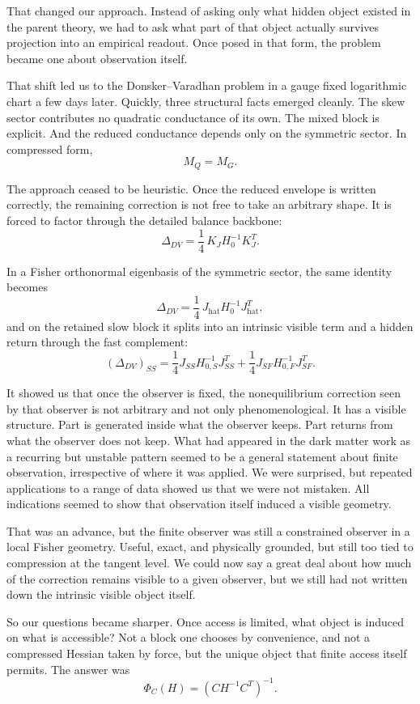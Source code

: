 \documentclass[11pt,a4paper]{article}
\numberwithin{equation}{section}
\theoremstyle{thmcompact}
\theoremstyle{remark}
\begin{document}
That changed our approach. Instead of asking only what hidden object existed in the parent theory, we had to ask what part of that object actually survives projection into an empirical readout. Once posed in that form, the problem became one about observation itself.

That shift led us to the Donsker--Varadhan problem in a gauge fixed logarithmic chart a few days later. Quickly, three structural facts emerged cleanly. The skew sector contributes no quadratic conductance of its own. The mixed block is explicit. And the reduced conductance depends only on the symmetric sector. In compressed form,
\[
M_Q = M_G.
\]

The approach ceased to be heuristic. Once the reduced envelope is written correctly, the remaining correction is not free to take an arbitrary shape. It is forced to factor through the detailed balance backbone:
\[
\Delta_{DV} = \frac14 \, K_J H_0^{-1} K_J^T.
\]

In a Fisher orthonormal eigenbasis of the symmetric sector, the same identity becomes
\[
\Delta_{DV} = \frac14 \, J_{\mathrm{hat}} H_0^{-1} J_{\mathrm{hat}}^T,
\]
and on the retained slow block it splits into an intrinsic visible term and a hidden return through the fast complement:
\[
(\Delta_{DV})_{SS}
=
\frac14 J_{SS}H_{0,S}^{-1}J_{SS}^T
+
\frac14 J_{SF}H_{0,F}^{-1}J_{SF}^T.
\]

It showed us that once the observer is fixed, the nonequilibrium correction seen by that observer is not arbitrary and not only phenomenological. It has a visible structure. Part is generated inside what the observer keeps. Part returns from what the observer does not keep. What had appeared in the dark matter work as a recurring but unstable pattern seemed to be a general statement about finite observation, irrespective of where it was applied. We were surprised, but repeated applications to a range of data showed us that we were not mistaken. All indications seemed to show that observation itself induced a visible geometry.

That was an advance, but the finite observer was still a constrained observer in a local Fisher geometry. Useful, exact, and physically grounded, but still too tied to compression at the tangent level. We could now say a great deal about how much of the correction remains visible to a given observer, but we still had not written down the intrinsic visible object itself.

So our questions became sharper. Once access is limited, what object is induced on what is accessible? Not a block one chooses by convenience, and not a compressed Hessian taken by force, but the unique object that finite access itself permits. The answer was
\[
\Phi_C(H) = (C H^{-1} C^T)^{-1}.
\]
\end{document}
